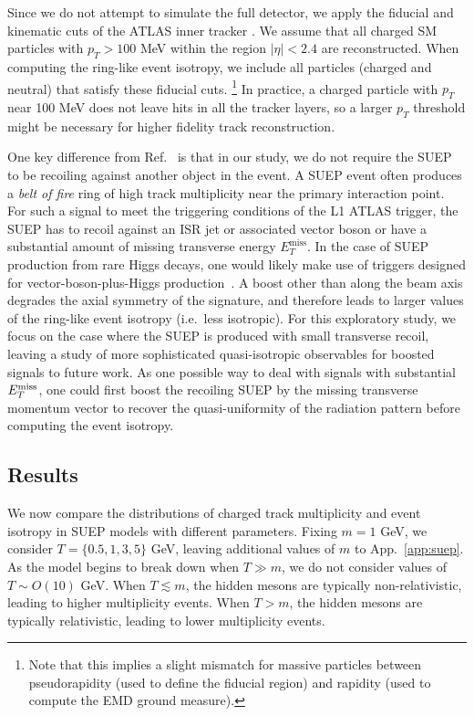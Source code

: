 \documentclass[letterpaper,11pt]{article}
\DeclareRobustCommand{\App}[1]{App.~\ref{#1}}
\DeclareRobustCommand{\Ref}[1]{Ref.~\cite{#1}}
\begin{document}
Since we do not attempt to simulate the full detector, we apply the fiducial and kinematic cuts of the ATLAS inner tracker \cite{Aaboud:2016itf}.
%
We assume that all charged SM particles with $p_T > 100$ MeV within the region $|\eta| < 2.4$ are reconstructed.
%
When computing the ring-like event isotropy, we include all particles (charged and neutral) that satisfy these fiducial cuts.%
%
\footnote{Note that this implies a slight mismatch for massive particles between pseudorapidity (used to define the fiducial region) and rapidity (used to compute the EMD ground measure).}
%
In practice, a charged particle with $p_T$ near 100 MeV does not leave hits in all the tracker layers, so a larger $p_T$ threshold might be necessary for higher fidelity track reconstruction. 


One key difference from \Ref{Knapen:2016hky} is that in our study, we do not require the SUEP to be recoiling against another object in the event.
%
A SUEP event often produces a \textit{belt of fire} ring of high track multiplicity near the primary interaction point.
For such a signal to meet the triggering conditions of the L1 ATLAS trigger, the SUEP has to recoil against an ISR jet or associated vector boson or have a substantial amount of missing transverse energy $E_T^\text{miss}$.
%
In the case of SUEP production from rare Higgs decays, one would likely make use of triggers designed for vector-boson-plus-Higgs production~\cite{ATLAS-CONF-2020-007}.
%
A boost other than along the beam axis degrades the axial symmetry of the signature, and therefore leads to larger values of the ring-like event isotropy (i.e.~less isotropic).
%
For this exploratory study, we focus on the case where the SUEP is produced with small transverse recoil, leaving a study of more sophisticated quasi-isotropic observables for boosted signals to future work.
%
As one possible way to deal with signals with substantial $E_T^\text{\rm miss}$, one could first boost the recoiling SUEP by the missing transverse momentum vector to recover the quasi-uniformity of the radiation pattern before computing the event isotropy.


\subsection{Results}


We now compare the distributions of charged track multiplicity and event isotropy in SUEP models with different parameters.
%
Fixing $m = 1$ GeV, we consider $T = \{0.5, 1, 3, 5\}$ GeV, leaving additional values of $m$ to \App{app:suep}. 
%
As the model begins to break down when $T \gg m$, we do not consider values of $T \sim O(10)$ GeV.
%
When $T \lesssim m$, the hidden mesons are typically non-relativistic, leading to higher multiplicity events.
%
When $T > m$, the hidden mesons are typically relativistic, leading to lower multiplicity events.
\end{document}
